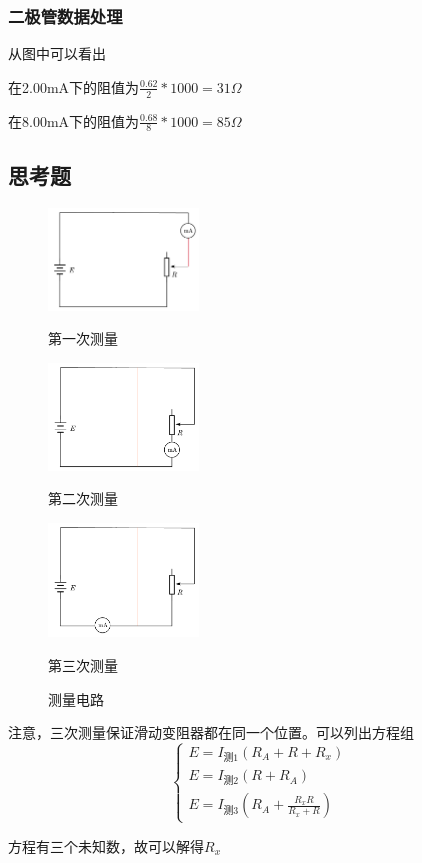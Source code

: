 \documentclass[12pt,a4paper,UTF8]{ctexart}
\begin{document}
	\subsubsection*{二极管数据处理}
	\par 从图中可以看出
	\par 在2.00mA下的阻值为$\frac{0.62}{2}*1000 = 31\Omega$
	\par 在8.00mA下的阻值为$\frac{0.68}{8}*1000 = 85\Omega$
	\subsection*{思考题}
	

			\begin{figure}[htbp]
		\centering
		\begin{minipage}[t]{0.48\textwidth}
			\centering
			\includegraphics[width=4cm]{思考题1}
			\caption*{第一次测量}
		\end{minipage}
		\begin{minipage}[t]{0.48\textwidth}
			\centering
			\includegraphics[width=4cm]{思考题2}
			\caption*{第二次测量}
		\end{minipage}	\begin{minipage}[t]{0.48\textwidth}
		\centering
		\includegraphics[width=4cm]{思考题3}
		\caption*{第三次测量}
	\end{minipage}
		\caption{测量电路}
	\end{figure}
	\par 注意，三次测量保证滑动变阻器都在同一个位置。可以列出方程组
	$$
	\begin{cases}
		E = I_{测1}(R_A+R+R_x)\\
		E = I_{测2}(R+R_A)\\
		E = I_{测3}(R_A+\frac{R_xR}{R_x+R})
	\end{cases}
	$$	
	\par 方程有三个未知数，故可以解得$R_x$
	
	
	
	
	
\end{document}
